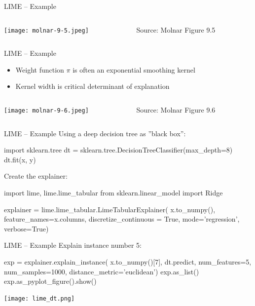 \documentclass[ignorenonframetext,xcolor=x11names]{beamer}
\begin{document}
\begin{frame}{LIME -- Example}
\begin{columns}
\begin{column}{.8\textwidth}
\texttt{[image: molnar-9-5.jpeg]} 
\end{column}
\begin{column}{.2\textwidth}
\scriptsize Source: Molnar Figure 9.5
\end{column}
\end{columns}
\end{frame}

\begin{frame}{LIME -- Example}
\begin{itemize}
   \item Weight function $\pi$ is often an exponential smoothing kernel
   \item Kernel width is critical determinant of explanation
\end{itemize}
\begin{columns}
\begin{column}{.9\textwidth}
\texttt{[image: molnar-9-6.jpeg]}
\end{column}
\begin{column}{.15\textwidth}
\scriptsize Source: Molnar Figure 9.6
\end{column}
\end{columns}
\end{frame}

\begin{frame}[fragile]{LIME -- Example}
Using a deep decision tree as ''black box'':
\begin{pythoncode}
import sklearn.tree
dt = sklearn.tree.DecisionTreeClassifier(max_depth=8)
dt.fit(x, y)
\end{pythoncode}
Create the explainer:
\begin{pythoncode}
import lime, lime.lime_tabular
from sklearn.linear_model import Ridge

explainer = lime.lime_tabular.LimeTabularExplainer(
    x.to_numpy(), 
    feature_names=x.columns, 
    discretize_continuous = True, 
    mode='regression', 
    verbose=True)
\end{pythoncode}
\end{frame}

\begin{frame}[fragile]{LIME -- Example}
Explain instance number 5:
\begin{pythoncode}
exp = explainer.explain_instance( 
    x.to_numpy()[7], 
    dt.predict, 
    num_features=5, 
    num_samples=1000, 
    distance_metric='euclidean')
exp.as_list()
exp.as_pyplot_figure().show()
\end{pythoncode}

\texttt{[image: lime\_dt.png]}
\end{frame}
\end{document}
